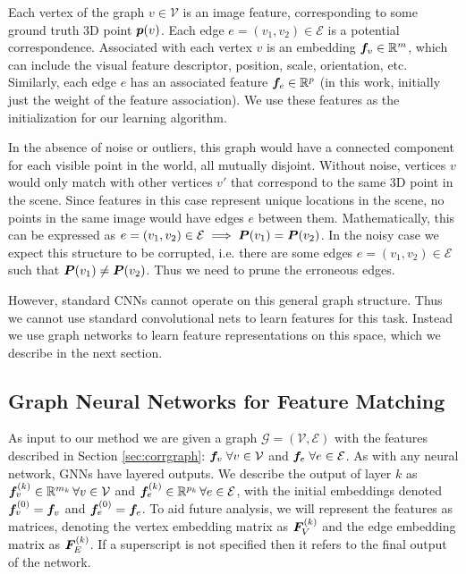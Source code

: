 \documentclass{article} %
\begin{document}
Each vertex of the graph $v \in \mathcal{V}$ is an image feature, corresponding to some ground truth 3D point ${\bm{p}}(v)$.
Each edge $e = (v_1, v_2) \in \mathcal{E}$ is a potential correspondence.
Associated with each vertex $v$ is an embedding ${\bm{f}}_v \in {\mathbb{R}}^m$, which can include the visual feature descriptor, position, scale, orientation, etc.
Similarly, each edge $e$ has an associated feature ${\bm{f}}_e \in {\mathbb{R}}^p$ (in this work, initially just the weight of the feature association).
We use these features as the initialization for our learning algorithm.

In the absence of noise or outliers, this graph would have a connected component for each visible point in the world, all mutually disjoint.
Without noise, vertices $v$ would only match with other vertices $v'$ that correspond to the same 3D point in the scene.
Since features in this case represent unique locations in the scene, no points in the same image would have edges $e$ between them.
Mathematically, this can be expressed as $e = (v_1, v_2) \in \mathcal{E} \implies {\bm{P}}(v_1) = {\bm{P}}(v_2)$.
In the noisy case we expect this structure to be corrupted, i.e. there are some edges $e = (v_1, v_2) \in \mathcal{E}$ such that ${\bm{P}}(v_1) \neq {\bm{P}}(v_2)$.
Thus we need to prune the erroneous edges.

However, standard CNNs cannot operate on this general graph structure.
Thus we cannot use standard convolutional nets to learn features for this task.
Instead we use graph networks to learn feature representations on this space, which we describe in the next section.

\subsection{Graph Neural Networks for Feature Matching} \label{sec:gnns}
As input to our method we are given a graph $\mathcal{G} = (\mathcal{V}, \mathcal{E})$ with the features described in Section \ref{sec:corrgraph}: ${\bm{f}}_v \; \forall v \in \mathcal{V}$ and ${\bm{f}}_e \; \forall e \in \mathcal{E}$.
As with any neural network, GNNs have layered outputs.
We describe the output of layer $k$ as ${\bm{f}}_v^{(k)} \in {\mathbb{R}}^{m_k} \, \forall v \in \mathcal{V}$ and ${\bm{f}}_e^{(k)} \in {\mathbb{R}}^{p_k}\, \forall e \in \mathcal{E}$, with the initial embeddings denoted ${\bm{f}}_v^{(0)} = {\bm{f}}_v$ and ${\bm{f}}_e^{(0)} = {\bm{f}}_e$.
To aid future analysis, we will represent the features as matrices, denoting the vertex embedding matrix as ${\bm{F}}_V^{(k)}$ and the edge embedding matrix as ${\bm{F}}_E^{(k)}$.
If a superscript is not specified then it refers to the final output of the network.
\end{document}
